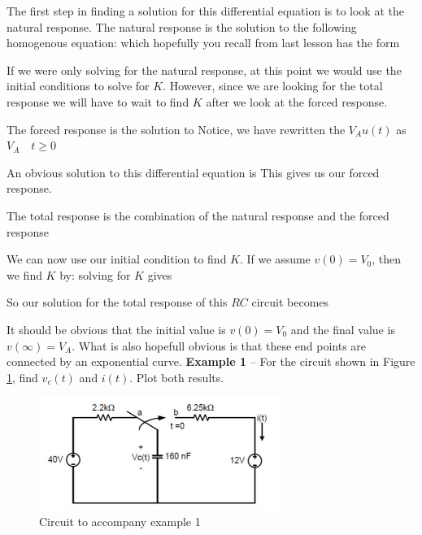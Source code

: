 \documentclass{handout}
\begin{document}
The first step in finding a solution for this differential equation is to look at the natural response.  The natural response is the solution to the following homogenous equation:
which hopefully you recall from last lesson has the form

If we were only solving for the natural response, at this point we would use the initial conditions to solve for $K$.  However, since we are looking for the total response we will have to wait to find $K$ after we look at the forced response.

The forced response is the solution to
Notice, we have rewritten the $V_Au(t)$ as $V_A \quad t\ge0$

An obvious solution to this differential equation is
This gives us our forced response.

The total response is the combination of the natural response and the forced response

We can now use our initial condition to find $K$. If we assume $v(0) = V_0$, then we find $K$ by:
solving for $K$ gives

So our solution for the total response of this $RC$ circuit becomes

It should be obvious that the initial value is $v(0) = V_0$ and the final value is $v(\infty) = V_A$. What is also hopefull obvious is that these end points are connected by an exponential curve.
\newpage
\clearpage
\pagebreak
\textbf{Example 1} -- For the circuit shown in Figure \ref{fig: Example1}, find $v_c(t)$ and $i(t)$.  Plot both results.

\begin{figure} [h!]
\centering
\includegraphics[width=0.7\textwidth]{Example1.jpg}
\caption{Circuit to accompany example 1}
\label{fig: Example1}
\end{figure}
\end{document}
